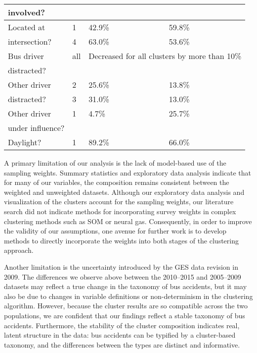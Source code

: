 \begin{table}[t]
{\begin{tabular}{@{}llll@{}}
                involved?                        &        &                                            &  \\                                              \midrule
                Located at                       & 1       & 42.9\%                                            & 59.8\%  \\
                intersection?                   & 4       & 63.0\%                                            & 53.6\% \\                     \midrule
                Bus driver                        & all     & \multicolumn{2}{l}{Decreased for all clusters by more than 10\%}  \\ 
                distracted?                      &         & \\ \midrule
                Other driver                     & 2       & 25.6\% & 13.8\% \\
                distracted?                       & 3        & 31.0\% & 13.0\%  \\ \midrule
                Other driver                     & 1       & 4.7\% & 25.7\%  \\ 
                under influence?              &         & \\ \midrule
                Daylight?                         & 1       & 89.2\% & 66.0\%  \\\bottomrule
        \end{tabular}
        }
\end{table}

A primary limitation of our analysis is the lack of model-based use of
the sampling weights. Summary statistics and exploratory data analysis
indicate that for many of our variables, the composition remains
consistent between the weighted and unweighted datasets. Although our
exploratory data analysis and visualization of the clusters account
for the sampling weights, our literature search did not indicate
methods for incorporating survey weights in complex clustering methods
such as SOM or neural gas. Consequently, in order to improve the
validity of our assumptions, one avenue for further work is to develop
methods to directly incorporate the weights into both stages of the
clustering approach.

Another limitation is the uncertainty introduced by the GES data
revision in 2009. The differences we observe above between the
2010--2015 and 2005--2009 datasets may reflect a true change in the
taxonomy of bus accidents, but it may also be due to changes in
variable definitions or non-determinism in the clustering
algorithm. However, because the cluster results are so compatible
across the two populations, we are confident that our findings reflect
a stable taxonomy of bus accidents. Furthermore, the stability of the
cluster composition indicates real, latent structure in the data: bus
accidents can be typified by a cluster-based taxonomy, and the
differences between the types are distinct and informative.

